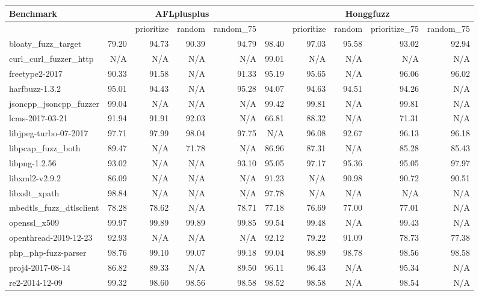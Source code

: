 \begin{table}
  {\scriptsize
    \begin{tabular}{l||r|r|r|r||r|r|r|r|r}
      Benchmark & \multicolumn{4}{|c||}{AFLplusplus} & \multicolumn{5}{|c}{Honggfuzz} \\
      \hline
     & & prioritize & random & random\_75 & & prioritize & random & prioritize\_75 & random\_75 \\
        \hline
        \hline
bloaty\_fuzz\_target & 79.20 & 94.73 & 90.39 & 94.79 & 98.40 & 97.03 & 95.58 & 93.02 & 92.94 \\
curl\_curl\_fuzzer\_http & N/A & N/A & N/A & N/A & 99.01 & N/A & N/A & N/A & N/A \\
freetype2-2017 & 90.33 & 91.58 & N/A & 91.33 & 95.19 & 95.65 & N/A & 96.06 & 96.02 \\
harfbuzz-1.3.2 & 95.01 & 94.43 & N/A & 95.28 & 94.07 & 94.63 & 94.51 & 94.26 & N/A \\
jsoncpp\_jsoncpp\_fuzzer & 99.04 & N/A & N/A & N/A & 99.42 & 99.81 & N/A & 99.81 & N/A \\
lcms-2017-03-21 & 91.94 & 91.91 & 92.03 & N/A & 66.81 & 88.32 & N/A & 71.31 & N/A \\
libjpeg-turbo-07-2017 & 97.71 & 97.99 & 98.04 & 97.75 & N/A & 96.08 & 92.67 & 96.13 & 96.18 \\
libpcap\_fuzz\_both & 89.47 & N/A & 71.78 & N/A & 86.96 & 87.31 & N/A & 85.28 & 85.43 \\
libpng-1.2.56 & 93.02 & N/A & N/A & 93.10 & 95.05 & 97.17 & 95.36 & 95.05 & 97.97 \\
libxml2-v2.9.2 & 86.09 & N/A & N/A & N/A & 91.23 & N/A & 90.98 & 90.72 & 90.51 \\
libxslt\_xpath & 98.84 & N/A & N/A & N/A & 97.78 & N/A & N/A & N/A & N/A \\
mbedtls\_fuzz\_dtlsclient & 78.28 & 78.62 & N/A & 78.71 & 77.18 & 76.69 & 77.00 & 77.01 & N/A \\
openssl\_x509 & 99.97 & 99.89 & 99.89 & 99.85 & 99.54 & 99.48 & N/A & 99.43 & N/A \\
openthread-2019-12-23 & 92.93 & N/A & N/A & N/A & 92.12 & 79.22 & 91.09 & 78.73 & 77.38 \\
php\_php-fuzz-parser & 98.76 & 99.10 & 99.07 & 99.18 & 99.04 & 98.89 & 98.78 & 98.56 & 98.58 \\
proj4-2017-08-14 & 86.82 & 89.33 & N/A & 89.50 & 96.11 & 96.43 & N/A & 95.34 & N/A \\
re2-2014-12-09 & 99.32 & 98.60 & 98.56 & 98.58 & 98.52 & 98.58 & N/A & 98.54 & N/A \\

\end{tabular}}
\end{table}
